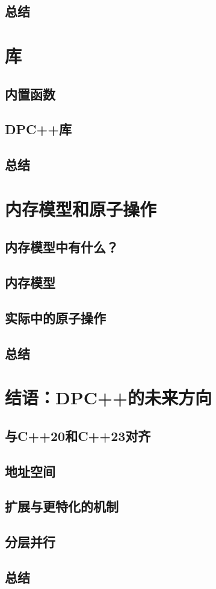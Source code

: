 \documentclass[11pt,a4paper,UTF8]{ctexart}
\begin{document}
		\subsection{总结}
	\section{库}
		\subsection{内置函数}
		\subsection{DPC++库}
		\subsection{总结}
	\section{内存模型和原子操作}
		\subsection{内存模型中有什么？}
		\subsection{内存模型}
		\subsection{实际中的原子操作}
		\subsection{总结}
	\section{结语：DPC++的未来方向}
		\subsection{与C++20和C++23对齐}
		\subsection{地址空间}
		\subsection{扩展与更特化的机制}
		\subsection{分层并行}
		\subsection{总结}
\end{document}
